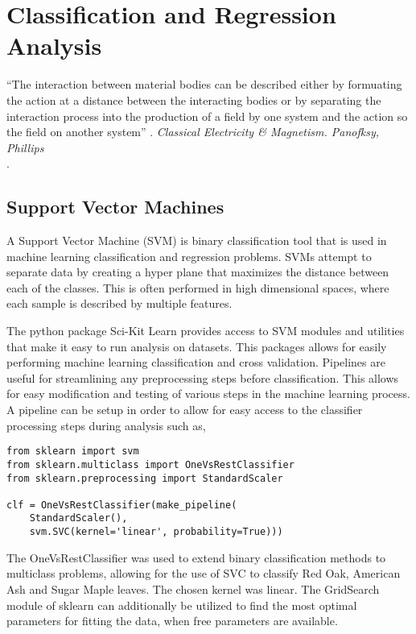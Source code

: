 \chapter{Classification and Regression Analysis}
\begin{center}
  \begin{minipage}{0.75\textwidth}
    \begin{small}
      “The interaction between material bodies can be described either by formuating the action at a distance between the interacting bodies or by separating the interaction process into the production of a field by one system and the action so the field on another system” .
      \emph{Classical Electricity \& Magnetism. Panofksy, Phillips}\\.
    \end{small}
  \end{minipage}
  \vspace{0.5cm}
\end{center}

\section{Support Vector Machines}
A Support Vector Machine (SVM) is binary classification tool that is used in machine learning classification and regression problems.  SVMs attempt to separate data by creating a hyper plane that maximizes the distance between each of the classes.  This is often performed in high dimensional spaces, where each sample is described by multiple features.

The python package Sci-Kit Learn provides access to SVM modules and utilities that make it easy to run analysis on datasets.  This packages allows for easily performing machine learning classification and cross validation.  Pipelines are useful for streamlining any preprocessing steps before classification.  This allows for easy modification and testing of various steps in the machine learning process.  A pipeline can be setup in order to allow for easy access to the classifier processing steps during analysis such as,
%
\begin{lstlisting}
from sklearn import svm
from sklearn.multiclass import OneVsRestClassifier
from sklearn.preprocessing import StandardScaler

clf = OneVsRestClassifier(make_pipeline(
	StandardScaler(),
	svm.SVC(kernel='linear', probability=True)))

\end{lstlisting}
%
The OneVsRestClassifier was used to extend binary classification methods to multiclass problems, allowing for the use of SVC to classify Red Oak, American Ash and Sugar Maple leaves.  The chosen kernel was linear.  The GridSearch module of sklearn can additionally be utilized to find the most optimal parameters for fitting the data, when free parameters are available.


